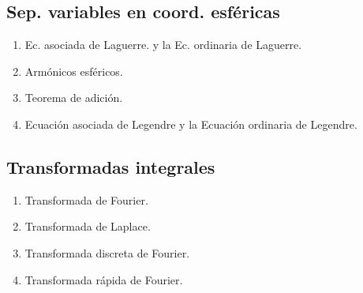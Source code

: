 \subsection{Sep. variables en coord. esféricas}

\begin{enumerate}[label=4.5.\arabic*]
\item Ec. asociada de Laguerre. y la Ec. ordinaria de Laguerre.
\item Armónicos esféricos.
\item Teorema de adición.
\item Ecuación asociada de Legendre y la Ecuación ordinaria de Legendre.
\end{enumerate}

\subsection{Transformadas integrales}

\begin{enumerate}[label=4.6.\arabic*]
\item Transformada de Fourier.
\item Transformada de Laplace.
\item Transformada discreta de Fourier.
\item Transformada rápida de Fourier.
\end{enumerate}

